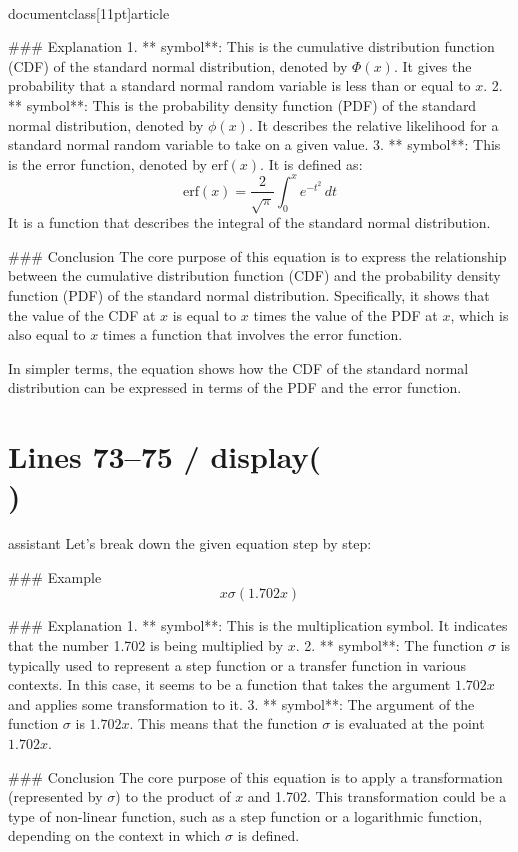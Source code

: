 \\documentclass[11pt]{article}
\begin{document}
### Explanation
1. ** symbol**: This is the cumulative distribution function (CDF) of the standard normal distribution, denoted by \(\Phi(x)\). It gives the probability that a standard normal random variable is less than or equal to \(x\).
2. ** symbol**: This is the probability density function (PDF) of the standard normal distribution, denoted by \(\phi(x)\). It describes the relative likelihood for a standard normal random variable to take on a given value.
3. ** symbol**: This is the error function, denoted by \(\text{erf}(x)\). It is defined as:
   \[
   \text{erf}(x) = \frac{2}{\sqrt{\pi}} \int_0^x e^{-t^2} \, dt
   \]
   It is a function that describes the integral of the standard normal distribution.

### Conclusion
The core purpose of this equation is to express the relationship between the cumulative distribution function (CDF) and the probability density function (PDF) of the standard normal distribution. Specifically, it shows that the value of the CDF at \(x\) is equal to \(x\) times the value of the PDF at \(x\), which is also equal to \(x\) times a function that involves the error function.

In simpler terms, the equation shows how the CDF of the standard normal distribution can be expressed in terms of the PDF and the error function.



\section*{Lines 73–75 / display(\\[ \\]) }
assistant
Let's break down the given equation step by step:

### Example
\[ x \sigma(1.702 x) \]

### Explanation
1. ** symbol**: This is the multiplication symbol. It indicates that the number 1.702 is being multiplied by \( x \).
2. ** symbol**: The function \(\sigma\) is typically used to represent a step function or a transfer function in various contexts. In this case, it seems to be a function that takes the argument \(1.702 x\) and applies some transformation to it.
3. ** symbol**: The argument of the function \(\sigma\) is \(1.702 x\). This means that the function \(\sigma\) is evaluated at the point \(1.702 x\).

### Conclusion
The core purpose of this equation is to apply a transformation (represented by \(\sigma\)) to the product of \( x \) and 1.702. This transformation could be a type of non-linear function, such as a step function or a logarithmic function, depending on the context in which \(\sigma\) is defined.
\end{document}
